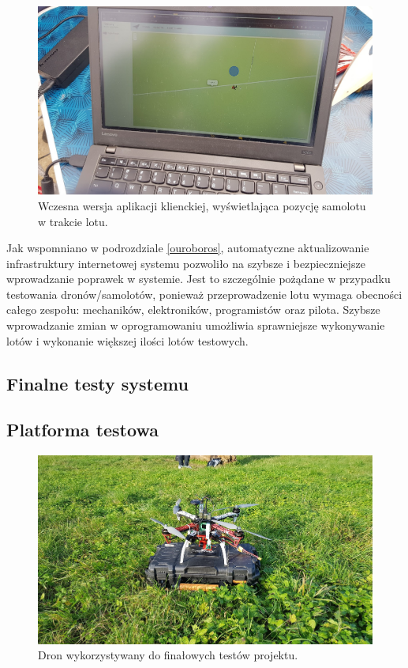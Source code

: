\begin{figure}[H]
	\centering
	\includegraphics[width=0.8\linewidth]{rys05/sae_telem.jpg}
    \caption{
        Wczesna wersja aplikacji klienckiej, wyświetlająca pozycję samolotu w trakcie lotu.
    }
	\label{telem_sae}
\end{figure}

Jak wspomniano w podrozdziale \ref{ouroboros}, automatyczne aktualizowanie infrastruktury
internetowej systemu pozwoliło na szybsze i bezpieczniejsze wprowadzanie poprawek w systemie.
Jest to szczególnie pożądane w przypadku testowania dronów/samolotów, ponieważ przeprowadzenie
lotu wymaga obecności całego zespołu: mechaników, elektroników, programistów oraz pilota. Szybsze
wprowadzanie zmian w oprogramowaniu umożliwia sprawniejsze wykonywanie lotów i wykonanie
większej ilości lotów testowych.

\subsection{Finalne testy systemu}
\subsection{Platforma testowa}
\begin{figure}[H]
	\centering
	\includegraphics[width=0.8\linewidth]{rys05/testing_drone.jpg}
    \caption{
        Dron wykorzystywany do finałowych testów projektu.
    }
	\label{testing_drone}
\end{figure}


